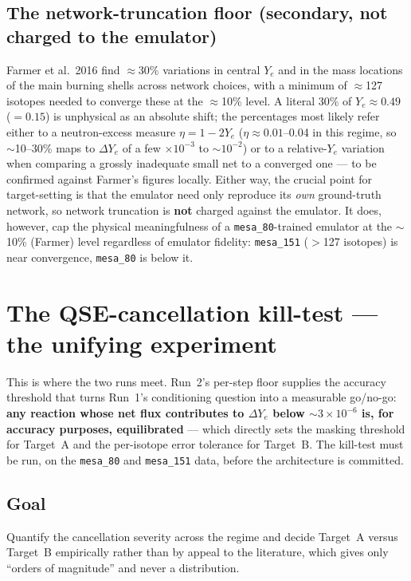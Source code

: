 \documentclass[11pt]{article}
\begin{document}
\subsection{The network-truncation floor (secondary, not charged to the emulator)}

Farmer et al.\ 2016 find $\approx$30\% variations in central $Y_e$ and in the mass locations of the main burning shells across network choices, with a minimum of $\approx$127 isotopes needed to converge these at the $\approx$10\% level. A literal 30\% of $Y_e \approx 0.49$ ($=0.15$) is unphysical as an absolute shift; the percentages most likely refer either to a neutron-excess measure $\eta = 1 - 2Y_e$ ($\eta \approx 0.01$--0.04 in this regime, so $\sim$10--30\% maps to $\Delta Y_e$ of a few $\times 10^{-3}$ to $\sim 10^{-2}$) or to a relative-$Y_e$ variation when comparing a grossly inadequate small net to a converged one --- to be confirmed against Farmer's figures locally. Either way, the crucial point for target-setting is that the emulator need only reproduce its \emph{own} ground-truth network, so network truncation is \textbf{not} charged against the emulator. It does, however, cap the physical meaningfulness of a \texttt{mesa\_80}-trained emulator at the $\sim$10\% (Farmer) level regardless of emulator fidelity: \texttt{mesa\_151} ($>$127 isotopes) is near convergence, \texttt{mesa\_80} is below it.

\section{The QSE-cancellation kill-test --- the unifying experiment}

This is where the two runs meet. Run~2's per-step floor supplies the accuracy threshold that turns Run~1's conditioning question into a measurable go/no-go: \textbf{any reaction whose net flux contributes to $\Delta Y_e$ below $\sim 3\times10^{-6}$ is, for accuracy purposes, equilibrated} --- which directly sets the masking threshold for Target~A and the per-isotope error tolerance for Target~B. The kill-test must be run, on the \texttt{mesa\_80} and \texttt{mesa\_151} data, before the architecture is committed.

\subsection{Goal}

Quantify the cancellation severity across the regime and decide Target~A versus Target~B empirically rather than by appeal to the literature, which gives only ``orders of magnitude'' and never a distribution.
\end{document}
